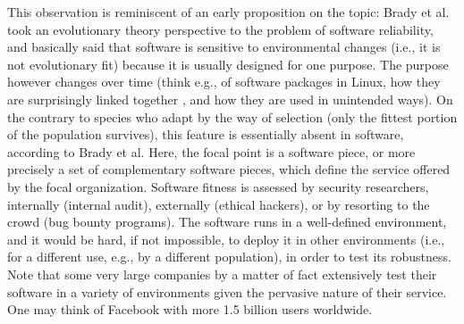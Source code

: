 This observation is reminiscent of an early proposition on the topic: Brady et al.  \cite{brady1999murphy} took an evolutionary theory perspective to the problem of software reliability, and basically said that software is sensitive to environmental changes (i.e., it is not evolutionary fit) because it is usually designed for one purpose. The purpose however changes over time (think e.g., of software packages in Linux, how they are surprisingly linked together  \cite{maillart2008empirical}, and how they are used in unintended ways). On the contrary to species who adapt by the way of selection (only the fittest portion of the population survives), this feature is essentially absent in software, according to Brady et al.
Here, the focal point is a software piece, or more precisely a set of complementary software pieces, which define the service offered by the focal organization. Software fitness is assessed by security researchers, internally (internal audit), externally (ethical hackers), or by resorting to the crowd (bug bounty programs). The software runs in a well-defined environment, and it would be hard, if not impossible, to deploy it in other environments (i.e., for a different use, e.g., by a different population), in order to test its robustness. Note that some very large companies by a matter of fact extensively test their software in a variety of environments given the pervasive nature of their service. One may think of Facebook with more 1.5 billion users worldwide.\\

